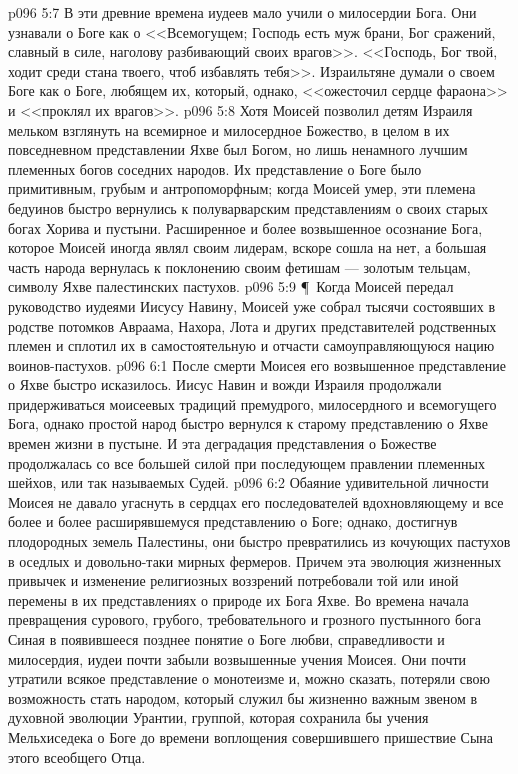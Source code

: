 \vs p096 5:7 В эти древние времена иудеев мало учили о милосердии Бога. Они узнавали о Боге как о <<Всемогущем; Господь есть муж брани, Бог сражений, славный в силе, наголову разбивающий своих врагов>>. <<Господь, Бог твой, ходит среди стана твоего, чтоб избавлять тебя>>. Израильтяне думали о своем Боге как о Боге, любящем их, который, однако, <<ожесточил сердце фараона>> и <<проклял их врагов>>.
\vs p096 5:8 Хотя Моисей позволил детям Израиля мельком взглянуть на всемирное и милосердное Божество, в целом в их повседневном представлении Яхве был Богом, но лишь ненамного лучшим племенных богов соседних народов. Их представление о Боге было примитивным, грубым и антропоморфным; когда Моисей умер, эти племена бедуинов быстро вернулись к полуварварским представлениям о своих старых богах Хорива и пустыни. Расширенное и более возвышенное осознание Бога, которое Моисей иногда являл своим лидерам, вскоре сошла на нет, а большая часть народа вернулась к поклонению своим фетишам --- золотым тельцам, символу Яхве палестинских пастухов.
\vs p096 5:9 \P\ Когда Моисей передал руководство иудеями Иисусу Навину, Моисей уже собрал тысячи состоявших в родстве потомков Авраама, Нахора, Лота и других представителей родственных племен и сплотил их в самостоятельную и отчасти самоуправляющуюся нацию воинов\hyp{}пастухов.
\vs p096 6:1 После смерти Моисея его возвышенное представление о Яхве быстро исказилось. Иисус Навин и вожди Израиля продолжали придерживаться моисеевых традиций премудрого, милосердного и всемогущего Бога, однако простой народ быстро вернулся к старому представлению о Яхве времен жизни в пустыне. И эта деградация представления о Божестве продолжалась со все большей силой при последующем правлении племенных шейхов, или так называемых Судей.
\vs p096 6:2 Обаяние удивительной личности Моисея не давало угаснуть в сердцах его последователей вдохновляющему и все более и более расширявшемуся представлению о Боге; однако, достигнув плодородных земель Палестины, они быстро превратились из кочующих пастухов в оседлых и довольно\hyp{}таки мирных фермеров. Причем эта эволюция жизненных привычек и изменение религиозных воззрений потребовали той или иной перемены в их представлениях о природе их Бога Яхве. Во времена начала превращения сурового, грубого, требовательного и грозного пустынного бога Синая в появившееся позднее понятие о Боге любви, справедливости и милосердия, иудеи почти забыли возвышенные учения Моисея. Они почти утратили всякое представление о монотеизме и, можно сказать, потеряли свою возможность стать народом, который служил бы жизненно важным звеном в духовной эволюции Урантии, группой, которая сохранила бы учения Мельхиседека о Боге до времени воплощения совершившего пришествие Сына этого всеобщего Отца.
